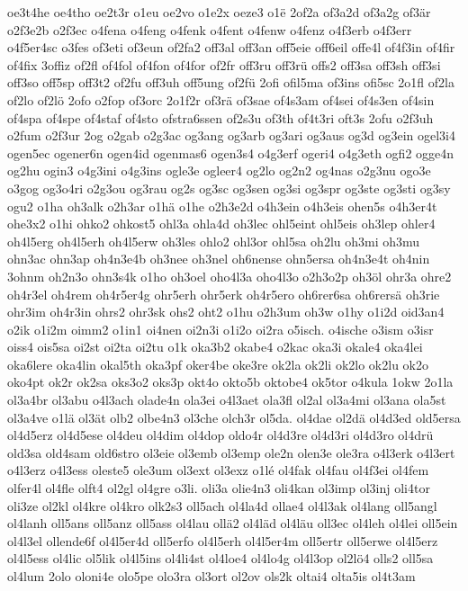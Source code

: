 {oe3t4he
oe4tho
oe2t3r
o1eu
oe2vo
o1e2x
oeze3
o1ë
2of2a
of3a2d
of3a2g
of3är
o2f3e2b
o2f3ec
o4fena
o4feng
o4fenk
o4fent
o4fenw
o4fenz
o4f3erb
o4f3err
o4f5er4sc
o3fes
of3eti
of3eun
of2fa2
off3al
off3an
off5eie
off6eil
offe4l
of4f3in
of4fir
of4fix
3offiz
of2fl
of4fol
of4fon
of4for
of2fr
off3ru
off3rü
offs2
off3sa
off3sh
off3si
off3so
off5sp
off3t2
of2fu
off3uh
off5ung
of2fü
2ofi
ofil5ma
of3ins
ofi5sc
2o1fl
of2la
of2lo
of2lö
2ofo
o2fop
of3orc
2o1f2r
of3rä
of3sae
of4s3am
of4sei
of4s3en
of4sin
of4spa
of4spe
of4staf
of4sto
ofstra6ssen
of2s3u
of3th
of4t3ri
oft3s
2ofu
o2f3uh
o2fum
o2f3ur
2og
o2gab
o2g3ac
og3ang
og3arb
og3ari
og3aus
og3d
og3ein
ogel3i4
ogen5ec
ogener6n
ogen4id
ogenmas6
ogen3s4
o4g3erf
ogeri4
o4g3eth
ogfi2
ogge4n
og2hu
ogin3
o4g3ini
o4g3ins
ogle3e
ogleer4
og2lo
og2n2
og4nas
o2g3nu
ogo3e
o3gog
og3o4ri
o2g3ou
og3rau
og2s
og3sc
og3sen
og3si
og3spr
og3ste
og3sti
og3sy
ogu2
o1ha
oh3alk
o2h3ar
o1hä
o1he
o2h3e2d
o4h3ein
o4h3eis
ohen5s
o4h3er4t
ohe3x2
o1hi
ohko2
ohkost5
ohl3a
ohla4d
oh3lec
ohl5eint
ohl5eis
oh3lep
ohler4
oh4l5erg
oh4l5erh
oh4l5erw
oh3les
ohlo2
ohl3or
ohl5sa
oh2lu
oh3mi
oh3mu
ohn3ac
ohn3ap
oh4n3e4b
oh3nee
oh3nel
oh6nense
ohn5ersa
oh4n3e4t
oh4nin
3ohnm
oh2n3o
ohn3s4k
o1ho
oh3oel
oho4l3a
oho4l3o
o2h3o2p
oh3öl
ohr3a
ohre2
oh4r3el
oh4rem
oh4r5er4g
ohr5erh
ohr5erk
oh4r5ero
oh6rer6sa
oh6rersä
oh3rie
ohr3im
oh4r3in
ohrs2
ohr3sk
ohs2
oht2
o1hu
o2h3um
oh3w
o1hy
o1i2d
oid3an4
o2ik
o1i2m
oimm2
o1in1
oi4nen
oi2n3i
o1i2o
oi2ra
o5isch.
o4ische
o3ism
o3isr
oiss4
ois5sa
oi2st
oi2ta
oi2tu
o1k
oka3b2
okabe4
o2kac
oka3i
okale4
oka4lei
oka6lere
oka4lin
okal5th
oka3pf
oker4be
oke3re
ok2la
ok2li
ok2lo
ok2lu
ok2o
oko4pt
ok2r
ok2sa
oks3o2
oks3p
okt4o
okto5b
oktobe4
ok5tor
o4kula
1okw
2o1la
ol3a4br
ol3abu
o4l3ach
olade4n
ola3ei
o4l3aet
ola3fl
ol2al
ol3a4mi
ol3ana
ola5st
ol3a4ve
o1lä
ol3ät
olb2
olbe4n3
ol3che
olch3r
ol5da.
ol4dae
ol2dä
ol4d3ed
old5ersa
ol4d5erz
ol4d5ese
ol4deu
ol4dim
ol4dop
oldo4r
ol4d3re
ol4d3ri
ol4d3ro
ol4drü
old3sa
old4sam
old6stro
ol3eie
ol3emb
ol3emp
ole2n
olen3e
ole3ra
o4l3erk
o4l3ert
o4l3erz
o4l3ess
oleste5
ole3um
ol3ext
ol3exz
o1lé
ol4fak
ol4fau
ol4f3ei
ol4fem
olfer4l
ol4fle
olft4
ol2gl
ol4gre
o3li.
oli3a
olie4n3
oli4kan
ol3imp
ol3inj
oli4tor
oli3ze
ol2kl
ol4kre
ol4kro
olk2s3
oll5ach
ol4la4d
ollae4
ol4l3ak
ol4lang
oll5angl
ol4lanh
oll5ans
oll5anz
oll5ass
ol4lau
ollä2
ol4läd
ol4läu
oll3ec
ol4leh
ol4lei
oll5ein
ol4l3el
ollende6f
ol4l5er4d
oll5erfo
ol4l5erh
ol4l5er4m
oll5ertr
oll5erwe
ol4l5erz
ol4l5ess
ol4lic
ol5lik
ol4l5ins
ol4li4st
ol4loe4
ol4lo4g
ol4l3op
ol2lö4
olls2
oll5sa
ol4lum
2olo
oloni4e
olo5pe
olo3ra
ol3ort
ol2ov
ols2k
oltai4
olta5is
ol4t3am
}
